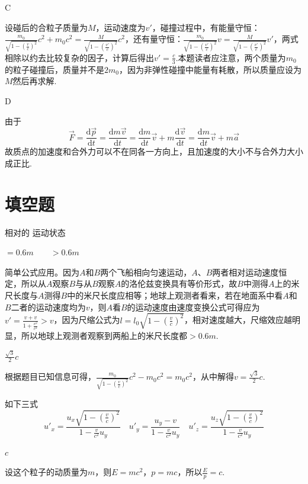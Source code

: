 \documentclass[b5paper,opensource,sourcefont,parskip]{qyxf-book}
\newcommand{\di}[1]{\mathrm{d}#1}
\begin{document}
C

\solve
设碰后的合粒子质量为$M$，运动速度为$v'$，碰撞过程中，有能量守恒：$\frac{m_0}{\sqrt{1-(\frac{v}{c})^2}}c^2+m_0c^2=\frac{M}{\sqrt{1-(\frac{v'}{c})^2}}c^2$，还有量守恒：$\frac{m_0}{\sqrt{1-(\frac{v'}{c})^2}}v=\frac{M}{\sqrt{1-(\frac{v'}{c})^2}}v'$，两式相除以约去比较复杂的因子，计算后得出$v'=\frac{c}{3}$.本题读者应注意，两个质量为$m_0$的粒子碰撞后，质量并不是$2m_0$，因为非弹性碰撞中能量有耗散，所以质量应设为$M$然后再求解.

D

\solve 由于
\begin{equation*}
\overrightarrow{F}=\frac{\di \overrightarrow{p}}{\di t}=\frac{\di m\overrightarrow{v}}{\di t}=\frac{\di m}{\di t}\overrightarrow{v}+m\frac{\di\overrightarrow{v}}{\di t}=\frac{\di m}{\di t}\overrightarrow{v}+m\overrightarrow{a}
\end{equation*}
故质点的加速度和合外力可以不在同各一方向上，且加速度的大小不与合外力大小成正比.

\section{填空题}
 相对的 \qquad 运动状态

 $=0.6m\qquad >0.6m$

\solve 简单公式应用。因为$A$和$B$两个飞船相向匀速运动，$A$、$B$两者相对运动速度恒定，所以从$A$观察$B$与从$B$观察$A$的洛伦兹变换具有等价形式，故$B$中测得$A$上的米尺长度与$A$测得$B$中的米尺长度应相等；地球上观测者看来，若在地面系中看$A$和$B$二者的运动速度均为$v$，则$A$看$B$的运动速度由速度变换公式可得应为$v'=\frac{v+v}{1+\frac{v^2}{c^2}}>v$，因为尺缩公式为$l=l_0\sqrt{1-(\frac{v}{c})^2}$，相对速度越大，尺缩效应越明显，所以地球上观测者观察到两船上的米尺长度都$>0.6m$.

 $\frac{\sqrt{3}}{2}c$

\solve
根据题目已知信息可得，$\frac{m_0}{\sqrt{1-(\frac{v}{c})^2}}c^2-m_0c^2=m_0c^2$，从中解得$v=\frac{\sqrt{3}}{2}c$.

 如下三式
\begin{equation*}
u'_x=\frac{u_x\sqrt{1-(\frac{v}{c})^2}}{1-\frac{v}{c^2}u_y}\quad u'_y=\frac{u_y-v}{1-\frac{v}{c^2}u_y}\quad u'_z=\frac{u_z\sqrt{1-(\frac{v}{c})^2}}{1-\frac{v}{c^2}u_y}
\end{equation*}

 $c$

\solve
设这个粒子的动质量为$m$，则$E=mc^2$，$p=mc$，所以$\frac{E}{p}=c$.
\end{document}
